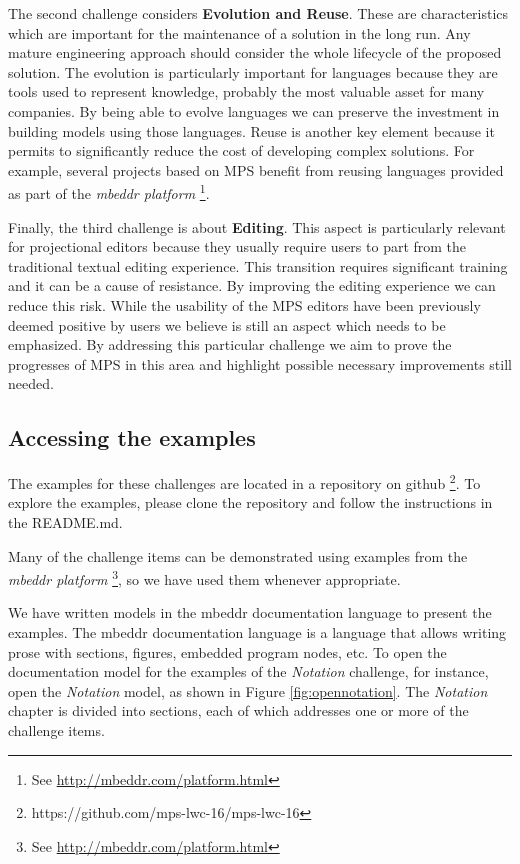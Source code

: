 \documentclass[preprint,numbers,10pt]{sigplanconf}
\begin{document}
The second challenge considers \textbf{Evolution and Reuse}. These are
characteristics which are important for the maintenance of a solution in the long run. Any
mature engineering approach should consider the whole lifecycle of the proposed
solution. The evolution is particularly important for languages because they are
tools used to represent knowledge, probably the most valuable asset for many
companies. By being able to evolve languages we can preserve the investment 
in building models using those languages. Reuse is another key element because
it permits to significantly reduce the cost of developing complex solutions. For
example, several projects based on MPS benefit from reusing languages provided
as part of the \emph{mbeddr platform} \footnote{See
\url{http://mbeddr.com/platform.html}}.

Finally, the third challenge is about \textbf{Editing}. This aspect is
particularly relevant for projectional editors because they usually require
users to part from the traditional textual editing experience. This transition
requires significant training and it can be a cause of resistance. By improving
the editing experience we can reduce this risk. While the usability of the MPS
editors have been previously deemed positive by users \cite{Voelter2014} we
believe is still an aspect which needs to be emphasized. By addressing this
particular challenge we aim to prove the progresses of MPS in this area and
highlight possible necessary improvements still needed.

\subsection{Accessing the examples}
The examples for these challenges are located in a repository on github
\footnote{https://github.com/mps-lwc-16/mps-lwc-16}. To explore the examples,
please clone the repository and follow the instructions in the README.md.

Many of the challenge items can be demonstrated using examples from the
\emph{mbeddr platform} \footnote{See \url{http://mbeddr.com/platform.html}},
so we have used them whenever appropriate.

We have written models in the mbeddr documentation language
to present the examples. The mbeddr documentation language is a language that allows
writing prose with sections, figures, embedded program nodes, etc. 
To open the documentation model for the examples of the \emph{Notation} challenge, for instance,
open the \emph{Notation} model, as shown in Figure \ref{fig:opennotation}. The \emph{Notation} chapter is
divided into sections, each of which addresses one or more of the challenge
items.
\end{document}
